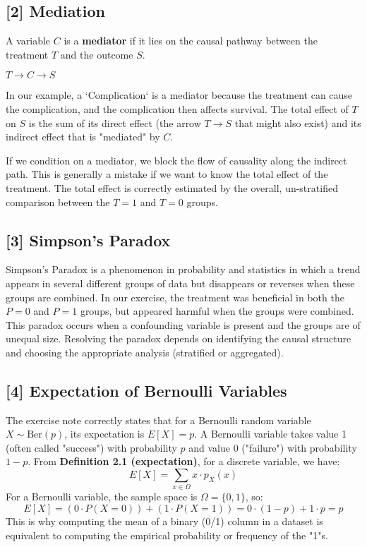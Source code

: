 \documentclass[11pt,a4paper]{article}
\begin{document}
\subsection{[2] Mediation}\label{sec:mediation}
A variable $C$ is a \textbf{mediator} if it lies on the causal pathway between the treatment $T$ and the outcome $S$.
\begin{center}
    $T \to C \to S$
\end{center}
In our example, a `Complication` is a mediator because the treatment can cause the complication, and the complication then affects survival. The total effect of $T$ on $S$ is the sum of its direct effect (the arrow $T \to S$ that might also exist) and its indirect effect that is "mediated" by $C$.

If we condition on a mediator, we block the flow of causality along the indirect path. This is generally a mistake if we want to know the total effect of the treatment. The total effect is correctly estimated by the overall, un-stratified comparison between the $T=1$ and $T=0$ groups.

\subsection{[3] Simpson's Paradox}\label{sec:simpson_paradox}
Simpson's Paradox is a phenomenon in probability and statistics in which a trend appears in several different groups of data but disappears or reverses when these groups are combined. In our exercise, the treatment was beneficial in both the $P=0$ and $P=1$ groups, but appeared harmful when the groups were combined. This paradox occurs when a confounding variable is present and the groups are of unequal size. Resolving the paradox depends on identifying the causal structure and choosing the appropriate analysis (stratified or aggregated).

\subsection{[4] Expectation of Bernoulli Variables}\label{sec:exp_bern}
The exercise note correctly states that for a Bernoulli random variable $X \sim \text{Ber}(p)$, its expectation is $E[X] = p$.
A Bernoulli variable takes value 1 (often called "success") with probability $p$ and value 0 ("failure") with probability $1-p$.
From \textbf{Definition 2.1 (expectation)}, for a discrete variable, we have:
$$ E[X] = \sum_{x \in \Omega} x \cdot p_X(x) $$
For a Bernoulli variable, the sample space is $\Omega = \{0, 1\}$, so:
$$ E[X] = (0 \cdot P(X=0)) + (1 \cdot P(X=1)) = 0 \cdot (1-p) + 1 \cdot p = p $$
This is why computing the mean of a binary (0/1) column in a dataset is equivalent to computing the empirical probability or frequency of the "1"s.
\end{document}
